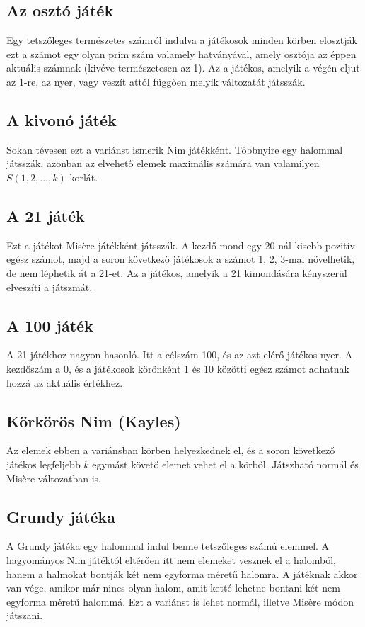 \subsection{Az osztó játék}
Egy tetszőleges természetes számról indulva a játékosok minden körben elosztják ezt a számot egy olyan prím szám valamely hatványával, amely osztója az éppen aktuális számnak (kivéve természetesen az 1). Az a játékos, amelyik a végén eljut az 1-re, az nyer, vagy veszít attól függően melyik változatát játsszák.

\subsection{A kivonó játék}
Sokan tévesen ezt a variánst ismerik Nim játékként. Többnyire egy halommal játsszák, azonban az elvehető elemek maximális számára van valamilyen $S(1, 2, ..., k)$ korlát.

\subsection{A 21 játék}
Ezt a játékot Misère játékként játsszák. A kezdő mond egy 20-nál kisebb pozitív egész számot, majd a soron következő játékosok a számot 1, 2, 3-mal növelhetik, de nem léphetik át a 21-et. Az a játékos, amelyik a 21 kimondására kényszerül elveszíti a játszmát.

\subsection{A 100 játék}
A 21 játékhoz nagyon hasonló. Itt a célszám 100, és az azt elérő játékos nyer. A kezdőszám a 0, és a játékosok körönként 1 és 10 közötti egész számot adhatnak hozzá az aktuális értékhez.

\subsection{Körkörös Nim (Kayles)}
Az elemek ebben a variánsban körben helyezkednek el, és a soron következő játékos legfeljebb $k$ egymást követő elemet vehet el a körből. Játszható normál és Misère változatban is.

\subsection{Grundy játéka}
A Grundy játéka egy halommal indul benne tetszőleges számú elemmel. A hagyományos Nim játéktól eltérően itt nem elemeket vesznek el a halomból, hanem a halmokat bontják két nem egyforma méretű halomra. A játéknak akkor van vége, amikor már nincs olyan halom, amit ketté lehetne bontani két nem egyforma méretű halommá. Ezt a variánst is lehet normál, illetve Misère módon játszani.

